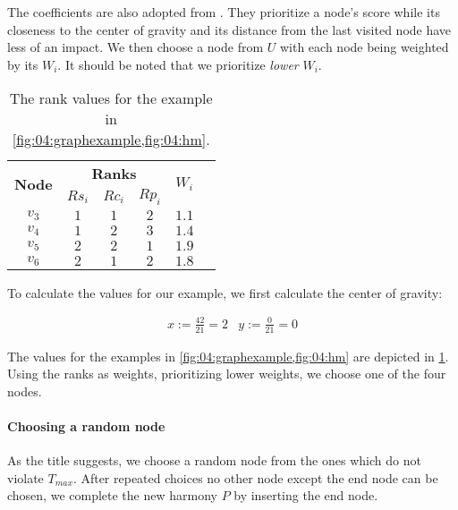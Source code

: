 The coefficients are also adopted from \citeauthor{szwarc_novel_2022} \cite{szwarc_novel_2022}.
They prioritize a node's score while its closeness to the center of gravity and its distance from the last visited node have less of an impact.
We then choose a node from $U$ with each node being weighted by its $W_i$.
It should be noted that we prioritize \emph{lower} $W_i$.

\begin{table}
	\centering
	\begin{tabular}[c]{|c|c|c|c|c|c|}
		\hline
		\multirow{2}{*}{\textbf{Node}} & \multicolumn{3}{c|}{\textbf{Ranks}} & \multirow{2}{*}{$W_i$}                  \\
		                               & $Rs_i$                              & $Rc_i$                 & $Rp_i$ &       \\\hline
		$v_3$                          & $1$                                 & $1$                    & $2$    & $1.1$ \\\hline
		$v_4$                          & $1$                                 & $2$                    & $3$    & $1.4$ \\\hline
		$v_5$                          & $2$                                 & $2$                    & $1$    & $1.9$ \\\hline
		$v_6$                          & $2$                                 & $1$                    & $2$    & $1.8$ \\\hline
	\end{tabular}
	\caption{The rank values for the example in \cref{fig:04:graphexample,fig:04:hm}.}
	\label{tab:04:ranks}
\end{table}

To calculate the values for our example, we first calculate the center of gravity:

\begin{align*}
	x := \frac{42}{21} = 2 & y := \frac{0}{21} = 0
\end{align*}

The values for the examples in \cref{fig:04:graphexample,fig:04:hm} are depicted in \cref{tab:04:ranks}.
Using the ranks as weights, prioritizing lower weights, we choose one of the four nodes.

\paragraph{Choosing a random node}

As the title suggests, we choose a random node from the ones which do not violate $T_{max}$.
After repeated choices no other node except the end node can be chosen, we complete the new harmony $P$ by inserting the end node.

